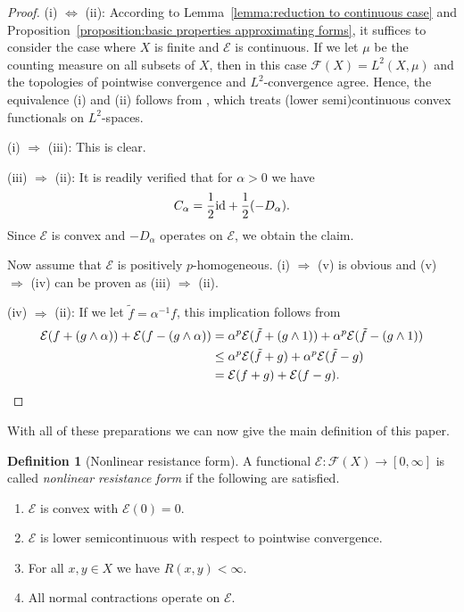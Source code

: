\documentclass[a4paper,11pt,reqno]{amsart}
\theoremstyle{definition}
\newtheorem{definition}[lemma]{Definition}
\numberwithin{equation}{section}
\newcommand{\cE}{{\mathcal E}}
\newcommand{\cF}{{\mathcal F}}
\newcommand{\1}{\mathds{1}}
\begin{document}
 
 \begin{proof}
  (i) $\Leftrightarrow$ (ii): According to Lemma~\ref{lemma:reduction to continuous case} and Proposition~\ref{proposition:basic properties approximating forms}, it suffices to consider the case where $X$ is finite and $\cE$ is continuous. If we let $\mu$ be the counting measure on all subsets of $X$, then in this case $\cF(X) = L^2(X,\mu)$ and the topologies of pointwise convergence and $L^2$-convergence agree. Hence, the equivalence (i) and (ii) follows from \cite[Theorem~2]{Puc25}, which treats (lower semi)continuous convex functionals on $L^2$-spaces. 
  
  (i) $\Rightarrow$ (iii): This is clear.
  
  (iii) $\Rightarrow$ (ii): It is readily verified that for $\alpha > 0$ we have
  $$C_\alpha = \frac{1}{2} {\rm id} + \frac{1}{2} (-D_\alpha).$$
  Since $\cE$ is convex and $-D_\alpha$ operates on $\cE$, we obtain the claim. 
  
  Now assume that $\cE$ is positively $p$-homogeneous. (i) $\Rightarrow$ (v) is obvious and (v) $\Rightarrow$ (iv) can be proven as (iii) $\Rightarrow$ (ii). 
  
  (iv) $\Rightarrow$ (ii): If we let $\tilde f  = \alpha^{-1} f$, this implication follows from 
  \begin{align*}
  \cE(f + (g \wedge \alpha)) + \cE(f - (g \wedge \alpha)) &= \alpha^p\cE(\tilde f + (g \wedge 1)) + \alpha^p \cE(\tilde f- (g \wedge 1))\\
  &\leq \alpha^p\cE(\tilde f + g ) + \alpha^p \cE(\tilde f - g)\\
  &= \cE(f + g) + \cE(f - g).   \hfill \qedhere
  \end{align*}
  
  
  \end{proof}

 With all of these preparations we can now give the main definition of this paper. 
 
\begin{definition}[Nonlinear resistance form]\label{definition:nonlinear resistance form}
 A functional $\cE \colon \cF(X) \to [0,\infty]$ is called {\em nonlinear resistance form} if the following are satisfied. 
\begin{enumerate}[(nRF1)]
 \item $\cE$ is convex with $\cE(0) = 0$. 
 \item $\cE$ is lower semicontinuous with respect to pointwise convergence.
 \item For all $x,y \in X$ we have $R(x,y) < \infty$. 
 \item All normal contractions operate on $\cE$. 
\end{enumerate}
\end{definition}
\end{document}
